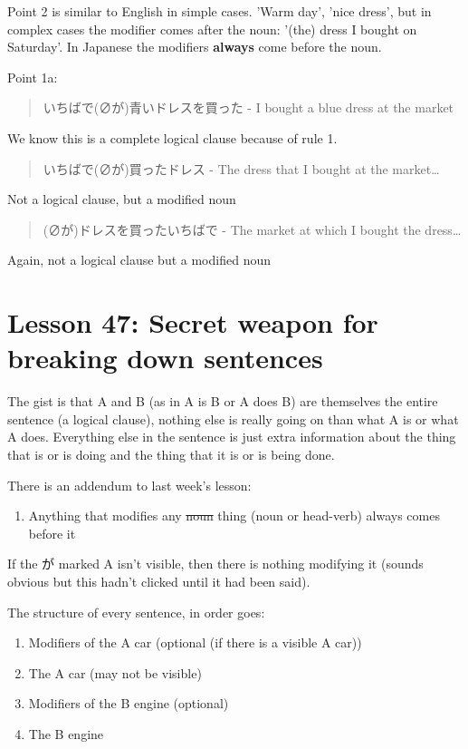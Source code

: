 \documentclass[11pt]{article}
\begin{document}
Point 2 is similar to English in simple cases. 'Warm day', 'nice dress', but in complex cases the modifier comes after the noun: '(the) dress I bought on Saturday'. In Japanese the modifiers \textbf{always} come before the noun.

Point 1a:
\begin{quote}
いちばで(∅が)青いドレスを買った - I bought a blue dress at the market
\end{quote}
We know this is a complete logical clause because of rule 1.

\begin{quote}
いちばで(∅が)買ったドレス - The dress that I bought at the market\ldots{}
\end{quote}
Not a logical clause, but a modified noun

\begin{quote}
(∅が)ドレスを買ったいちばで - The market at which I bought the dress\ldots{}
\end{quote}
Again, not a logical clause but a modified noun

\section{Lesson 47: Secret weapon for breaking down sentences}
\label{sec:org227e228}
The gist is that A and B (as in A is B or A does B) are themselves the entire sentence (a logical clause), nothing else is really going on than what A is or what A does. Everything else in the sentence is just extra information about the thing that is or is doing and the thing that it is or is being done.

There is an addendum to last week's lesson:
\begin{enumerate}
\item Anything that modifies any \sout{noun} thing (noun or head-verb) always comes before it
\end{enumerate}

If the が marked A isn't visible, then there is nothing modifying it (sounds obvious but this hadn't clicked until it had been said).

The structure of every sentence, in order goes:
\begin{enumerate}
\item Modifiers of the A car (optional (if there is a visible A car))
\item The A car (may not be visible)
\item Modifiers of the B engine (optional)
\item The B engine
\end{enumerate}
\end{document}
